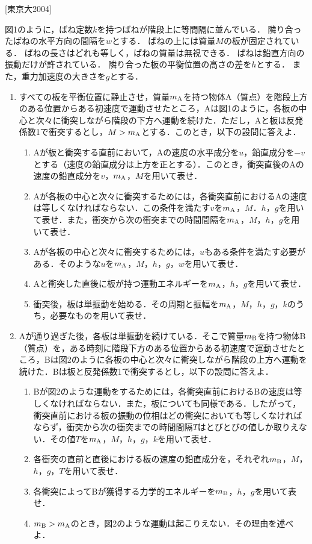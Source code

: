

\noindent
{} [東京大2004]

図1のように，ばね定数$k$を持つばねが階段上に等間隔に並んでいる．
隣り合ったばねの水平方向の間隔を$w$とする．
ばねの上には質量$M$の板が固定されている．
ばねの長さはどれも等しく，ばねの質量は無視できる．
ばねは鉛直方向の振動だけが許されている．
隣り合った板の平衡位置の高さの差を$h$とする．
また，重力加速度の大きさを$g$とする．

\begin{enumerate}[I]
  \item {\hzw}すべての板を平衡位置に静止させ，質量$m_\mathrm{A}$を持つ物体A（質点）を階段上方のある位置からある初速度で運動させたところ，Aは図1のように，各板の中心と次々に衝突しながら階段の下方へ運動を続けた．ただし，Aと板は反発係数1で衝突するとし，$M > m_\mathrm{A}$とする．このとき，以下の設問に答えよ．
  \begin{enumerate}[(1)]
    \item {\hzw}Aが板と衝突する直前において，Aの速度の水平成分を$u$，鉛直成分を$-v$とする（速度の鉛直成分は上方を正とする）．このとき，衝突直後のAの速度の鉛直成分を$v$，$m_\mathrm{A}$，$M$を用いて表せ．
    \item {\hzw}Aが各板の中心と次々に衝突するためには，各衝突直前におけるAの速度は等しくなければならない．この条件を満たす$v$を$m_\mathrm{A}$，$M$．$h$，$g$を用いて表せ．また，衝突から次の衝突までの時間間隔を$m_\mathrm{A}$，$M$，$h$，$g$を用いて表せ．
    \item {\hzw}Aが各板の中心と次々に衝突するためには，$u$もある条件を満たす必要がある．そのような$u$を$m_\mathrm{A}$，$M$，$h$，$g$，$w$を用いて表せ．
    \item {\hzw}Aと衝突した直後に板が持つ運動エネルギーを$m_\mathrm{A}$，$h$，$g$を用いて表せ．
    \item {\hzw}衝突後，板は単振動を始める．その周期と振幅を$m_\mathrm{A}$，$M$，$h$，$g$，$k$のうち，必要なものを用いて表せ．
  \end{enumerate}
  \item {\hzw}Aが通り過ぎた後，各板は単振動を続けている．そこで質量$m_\mathrm{B}$を持つ物体B（質点）を，ある時刻に階段下方のある位置からある初速度で運動させたところ，Bは図2のように各板の中心と次々に衝突しながら階段の上方へ運動を続けた．Bは板と反発係数1で衝突するとし，以下の設問に答えよ．
  \begin{enumerate}[(1)]
    \item {\hzw}Bが図2のような運動をするためには，各衝突直前におけるBの速度は等しくなければならない．また，板についても同様である．したがって，衝突直前における板の振動の位相はどの衝突においても等しくなければならず，衝突から次の衝突までの時間間隔$T$はとびとびの値しか取りえない．その値$T$を$m_\mathrm{A}$，$M$，$h$，$g$，$k$を用いて表せ．
    \item {\hzw}各衝突の直前と直後における板の速度の鉛直成分を，それぞれ$m_\mathrm{B}$，$M$，$h$，$g$，$T$を用いて表せ．
    \item {\hzw}各衝突によってBが獲得する力学的エネルギーを$m_\mathrm{B}$，$h$，$g$を用いて表せ．
    \item {\hzw}$m_\mathrm{B} > m_\mathrm{A}$のとき，図2のような運動は起こりえない．その理由を述べよ．
  \end{enumerate}
\end{enumerate}
